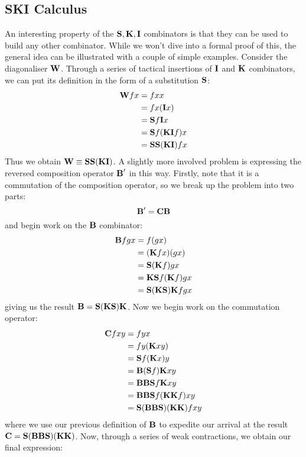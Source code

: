 \subsection{SKI Calculus}
An interesting property of the $\textbf S, \textbf K, \textbf I$ combinators is that they can be used to build any other combinator. While we won't dive into a formal proof of this, the general idea can be illustrated with a couple of simple examples.
Consider the diagonaliser $\textbf W$. Through a series of tactical insertions of $\textbf I$ and $\textbf K$ combinators, we can put its definition in the form of a substitution $\textbf S$:
\begin{align}
    \textbf W fx&=fxx\\
    &=fx(\textbf I x)\\
    &=\textbf S f\textbf I x\\
    &=\textbf S f(\textbf K\textbf I f)x\\
    &=\textbf S\textbf S(\textbf K\textbf I)fx
\end{align}
Thus we obtain $\textbf W\equiv\textbf S\textbf S(\textbf K\textbf I)$. A slightly more involved problem is expressing the reversed composition operator $\textbf B'$ in this way. Firstly, note that it is a commutation of the composition operator, so we break up the problem into two parts:
\begin{equation*}
    \textbf B'=\textbf C\textbf B
\end{equation*}
and begin work on the $\textbf B$ combinator:
\begin{align*}
    \textbf B fgx&=f(gx)\\
    &=(\textbf K fx)(gx)\\
    &=\textbf S(\textbf K f)gx\\
    &=\textbf K\textbf S f(\textbf K f)gx\\
    &=\textbf S(\textbf K\textbf S)\textbf K fgx
\end{align*}
giving us the result $\textbf B=\textbf S(\textbf K\textbf S)\textbf K$. Now we begin work on the commutation operator:
\begin{align*}
    \textbf C fxy&=fyx\\
    &=fy(\textbf K xy)\\
    &=\textbf S f(\textbf K x)y\\
    &=\textbf B(\textbf S f)\textbf K xy\\
    &=\textbf B\textbf B\textbf S f\textbf K xy\\
    &=\textbf B\textbf B\textbf S f(\textbf K\textbf K f)xy\\
    &=\textbf S(\textbf B\textbf B\textbf S)(\textbf K\textbf K)fxy
\end{align*}
where we use our previous definition of $\textbf B$ to expedite our arrival at the result $\textbf C=\textbf S(\textbf B\textbf B\textbf S)(\textbf K\textbf K)$. Now, through a series of weak contractions, we obtain our final expression:
